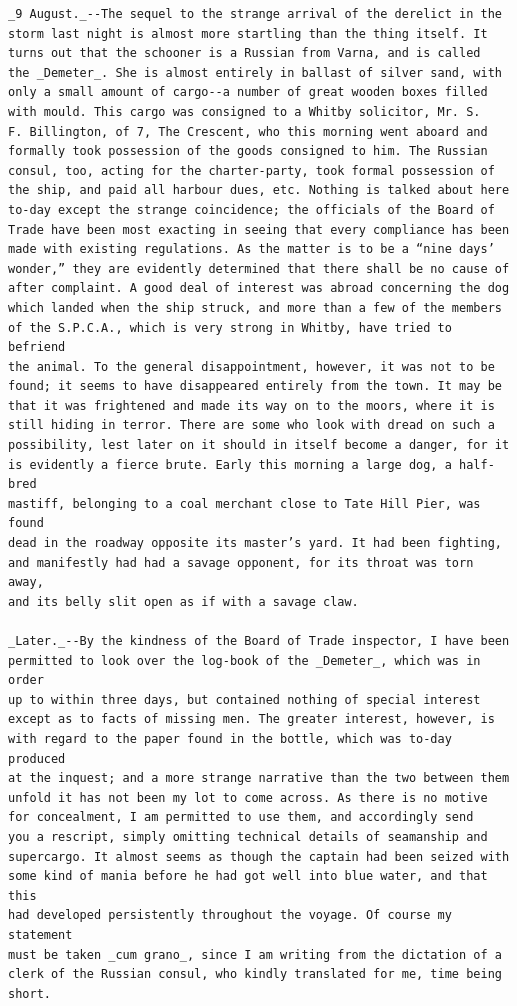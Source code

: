 \documentclass{article}
\begin{document}
\begin{verbatim}
_9 August._--The sequel to the strange arrival of the derelict in the
storm last night is almost more startling than the thing itself. It
turns out that the schooner is a Russian from Varna, and is called
the _Demeter_. She is almost entirely in ballast of silver sand, with
only a small amount of cargo--a number of great wooden boxes filled
with mould. This cargo was consigned to a Whitby solicitor, Mr. S.
F. Billington, of 7, The Crescent, who this morning went aboard and
formally took possession of the goods consigned to him. The Russian
consul, too, acting for the charter-party, took formal possession of
the ship, and paid all harbour dues, etc. Nothing is talked about here
to-day except the strange coincidence; the officials of the Board of
Trade have been most exacting in seeing that every compliance has been
made with existing regulations. As the matter is to be a “nine days’
wonder,” they are evidently determined that there shall be no cause of
after complaint. A good deal of interest was abroad concerning the dog
which landed when the ship struck, and more than a few of the members
of the S.P.C.A., which is very strong in Whitby, have tried to befriend
the animal. To the general disappointment, however, it was not to be
found; it seems to have disappeared entirely from the town. It may be
that it was frightened and made its way on to the moors, where it is
still hiding in terror. There are some who look with dread on such a
possibility, lest later on it should in itself become a danger, for it
is evidently a fierce brute. Early this morning a large dog, a half-bred
mastiff, belonging to a coal merchant close to Tate Hill Pier, was found
dead in the roadway opposite its master’s yard. It had been fighting,
and manifestly had had a savage opponent, for its throat was torn away,
and its belly slit open as if with a savage claw.

_Later._--By the kindness of the Board of Trade inspector, I have been
permitted to look over the log-book of the _Demeter_, which was in order
up to within three days, but contained nothing of special interest
except as to facts of missing men. The greater interest, however, is
with regard to the paper found in the bottle, which was to-day produced
at the inquest; and a more strange narrative than the two between them
unfold it has not been my lot to come across. As there is no motive
for concealment, I am permitted to use them, and accordingly send
you a rescript, simply omitting technical details of seamanship and
supercargo. It almost seems as though the captain had been seized with
some kind of mania before he had got well into blue water, and that this
had developed persistently throughout the voyage. Of course my statement
must be taken _cum grano_, since I am writing from the dictation of a
clerk of the Russian consul, who kindly translated for me, time being
short.



\end{verbatim}
\end{document}
